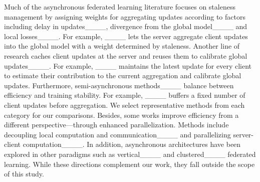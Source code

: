 Much of the asynchronous federated learning literature focuses on staleness management by assigning weights for aggregating updates according to factors including delay in updates____, divergence from the global model____ and local losses____. For example, ____ lets the server aggregate client updates into the global model with a weight determined by staleness. Another line of research caches client updates at the server and reuses them to calibrate global updates____. For example, ____ maintains the latest update for every client to estimate their contribution to the current aggregation and calibrate global updates. Furthermore, semi-asynchronous methods____ balance between efficiency and training stability. For example, ____ buffers a fixed number of client updates before aggregation. We select representative methods from each category for our comparisons. Besides, some works improve efficiency from a different perspective---through enhanced parallelization. Methods include decoupling local computation and communication____ and parallelizing server-client computation____. In addition, asynchronous architectures have been explored in other paradigms such as vertical____ and clustered____ federated learning. While these directions complement our work, they fall outside the scope of this study.